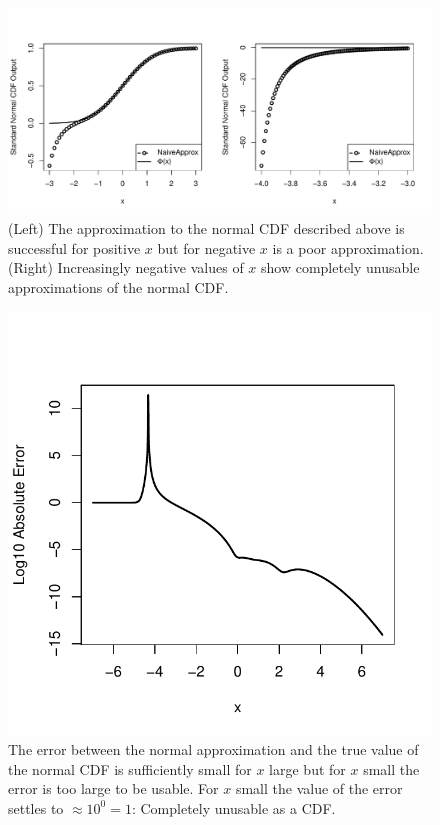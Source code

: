 \documentclass[11pt]{article}
\begin{document}
\begin{figure}[H]
	\centering
 	\includegraphics[scale=0.55]{../plots/q1/naive_approx1.pdf}
\caption{(Left) The approximation to the normal CDF described above is successful for positive $x$ but for negative $x$ is a poor approximation. (Right) Increasingly negative values of $x$ show completely unusable approximations of the normal CDF.}
\label{fig:naive_approx1}
\end{figure}

\begin{figure}[H]
	\centering
 	\includegraphics[scale=0.55]{../plots/q1/naive_approx_error.pdf}
\caption{The error between the normal approximation and the true value of the normal CDF is sufficiently small for $x$ large but for $x$ small the error is too large to be usable. For $x$ small the value of the error settles to $\approx 10^0 = 1$: Completely unusable as a CDF.}
\label{fig:naive_approx_error}
\end{figure}
\end{document}
